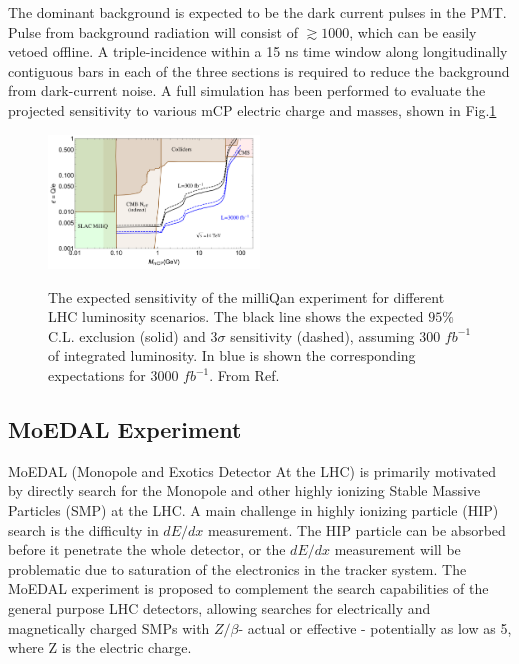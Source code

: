 The dominant background is expected to be the dark current pulses in the PMT. Pulse from background radiation will consist of $\gtrsim 1000$, which can be easily vetoed offline. A triple-incidence within a 15 ns time window along longitudinally contiguous bars in each of the three sections is required to reduce the background from dark-current noise. A full simulation has been performed to evaluate the projected sensitivity to various mCP electric charge and masses, shown in Fig.\ref{fig:mCPsensitivity}

\begin{figure}
    \centering
    \caption{The expected sensitivity of the milliQan experiment
for different LHC luminosity scenarios. The black line shows the
expected $95\%$ C.L. exclusion (solid) and 3$\sigma$ sensitivity (dashed), assuming 300 $fb^{-1}$ of integrated luminosity. In blue is shown the corresponding expectations for 3000 $fb^{-1}$. From Ref.\cite{mCPProposal}}
    \includegraphics[width=0.5\textwidth]{fig/mCPsensitivity.png}
    \label{fig:mCPsensitivity}
\end{figure}

\subsection{MoEDAL Experiment}

MoEDAL (Monopole and Exotics Detector At the LHC) \cite{MoEDALTDR} is primarily motivated by directly search for the Monopole and other highly ionizing Stable Massive Particles (SMP) at the LHC. A main challenge in highly ionizing particle (HIP) search is the difficulty in $dE/dx$ measurement. The HIP particle can be absorbed before it penetrate the whole detector, or the $dE/dx$ measurement will be problematic due to saturation of the electronics in the tracker system. The MoEDAL experiment is proposed to complement the search capabilities of the general purpose LHC detectors, allowing searches for electrically and magnetically charged SMPs with $Z/\beta$- actual or effective - potentially as low as 5, where Z is the electric charge.

